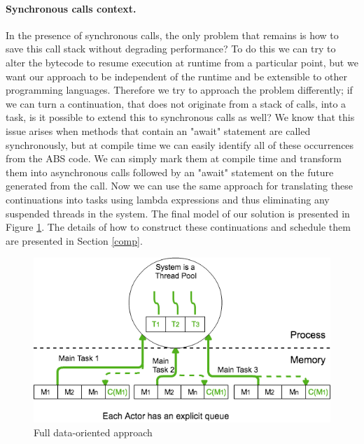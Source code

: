 
\paragraph{Synchronous calls context.}

In the presence of synchronous calls, the only problem that remains is how to save this call stack without degrading performance? To do this we can try to alter the bytecode to resume execution at runtime from a particular point, but we want our approach to be independent of the runtime and be extensible to other programming languages. Therefore we try to approach the problem differently; if we can turn a continuation, that does not originate from a stack of calls, into a task, is it possible to extend this to synchronous calls as well? We know that this issue arises when methods that contain an "await" statement are called synchronously, but at compile time we can easily identify all of these occurrences from the ABS code. We can simply mark them at compile time and transform them into asynchronous calls followed by an "await" statement on the future generated from the call. Now we can use the same approach for translating these continuations into tasks using lambda expressions and thus eliminating any suspended threads in the system. The final model of our solution is presented in Figure \ref{sol}. The details of how to construct these continuations and schedule them are presented in Section \ref{comp}. 

\begin{figure}
	\centering
	\includegraphics[scale=0.6]{solution.png}
	\caption{Full data-oriented approach}
	\label{sol}
\end{figure}


